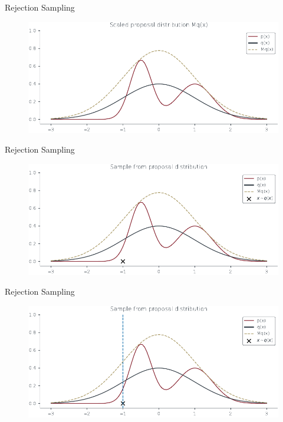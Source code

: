 \documentclass{beamer}
\begin{document}
    \begin{frame}{Rejection Sampling}
        \begin{figure}
            \centering
            \includegraphics[scale = 0.75]{../figures/sampling/rejection-sampling--1.0-True-True-False-False-False-False-False-False.pdf}
        \end{figure}
    \end{frame}

    \begin{frame}{Rejection Sampling}
        \begin{figure}
            \centering
            \includegraphics[scale = 0.75]{../figures/sampling/rejection-sampling--1.0-True-True-True-False-False-False-False-False.pdf}
        \end{figure}
    \end{frame}

    \begin{frame}{Rejection Sampling}
        \begin{figure}
            \centering
            \includegraphics[scale = 0.75]{../figures/sampling/rejection-sampling--1.0-True-True-True-True-False-False-False-False.pdf}
        \end{figure}
    \end{frame}
\end{document}
